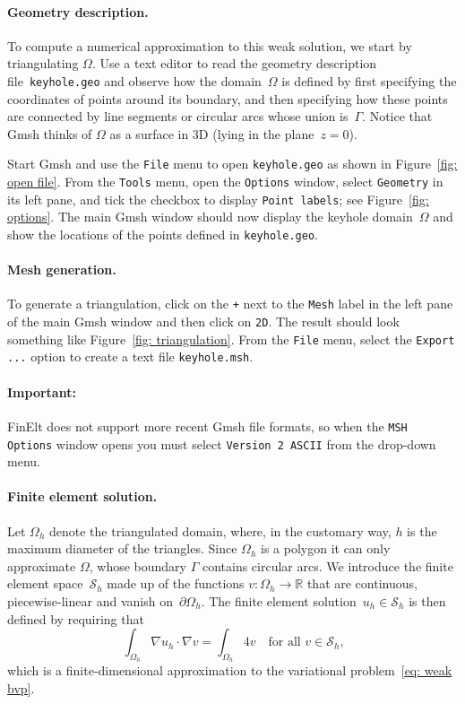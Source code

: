 \documentclass[a4paper,12pt]{article}
\begin{document}
\paragraph{Geometry description.}
To compute a numerical approximation to this weak solution, we start 
by triangulating $\Omega$.  Use a text editor to read the 
geometry description file~\verb!keyhole.geo! and observe how the 
domain~$\Omega$ is defined by first specifying the coordinates of 
points around its boundary, and then specifying how these points are 
connected by line segments or circular arcs whose union is~$\Gamma$.  
Notice that Gmsh thinks of $\Omega$ as a surface in 3D (lying in the 
plane~$z=0$).

Start Gmsh and use the \verb!File! menu to open 
\verb!keyhole.geo! as shown in Figure~\ref{fig: open file}.  
From the \verb!Tools! menu, open the \verb!Options! window, select 
\verb!Geometry! in its left pane, and tick the checkbox to display 
\verb!Point labels!; see Figure~\ref{fig: options}.  The main Gmsh 
window should now display the keyhole domain~$\Omega$ and show the 
locations of the points defined in \verb!keyhole.geo!.

\paragraph{Mesh generation.}
To generate a triangulation, click on the \verb!+! next to 
the \verb!Mesh! label in the left pane of the main Gmsh window and 
then click on \verb!2D!.  The result should look something like 
Figure~\ref{fig: triangulation}.  From the \verb!File! menu, select 
the \verb!Export ...! option to create a text file 
\verb!keyhole.msh!.  

\paragraph{Important:} FinElt does not support more recent Gmsh file 
formats, so when the \verb!MSH Options!  window opens you must select 
\verb!Version 2 ASCII! from the drop-down menu.

\paragraph{Finite element solution.}
Let $\Omega_h$ denote the triangulated domain, where, in the customary
way, $h$ is the maximum diameter of the triangles.  Since $\Omega_h$ 
is a polygon it can only approximate $\Omega$, whose boundary 
$\Gamma$ contains circular arcs.  We introduce the finite element 
space~$\mathcal{S}_h$ made up of the functions 
$v:\Omega_h\to\mathbb{R}$ that are continuous, piecewise-linear and 
vanish on~$\partial\Omega_h$.  The finite element 
solution~$u_h\in\mathcal{S}_h$ is then defined by requiring that
\begin{equation}\label{eq: finite elt problem}
\int_{\Omega_h}\nabla u_h\cdot\nabla v=\int_{\Omega_h} 4v
	\quad\text{for all $v\in\mathcal{S}_h$,}
\end{equation}
which is a finite-dimensional approximation to the variational 
problem~\eqref{eq: weak bvp}.
\end{document}
